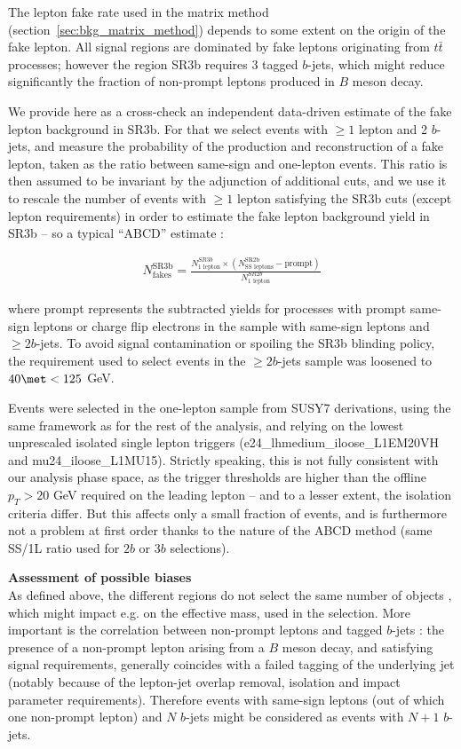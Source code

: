 The lepton fake rate used in the matrix method (section~\ref{sec:bkg_matrix_method}) depends to some extent on the origin of the fake lepton. 
All signal regions are dominated by fake leptons originating from $t\bar t$ processes; 
however the region SR3b requires 3 tagged $b$-jets, 
which might reduce significantly the fraction of non-prompt leptons produced in $B$ meson decay. 

We provide here as a cross-check an independent data-driven estimate of the fake lepton background in SR3b. 
For that we select events with $\ge 1$ lepton and 2 $b$-jets, 
and measure the probability of the production and reconstruction of a fake lepton, 
taken as the ratio between same-sign and one-lepton events. 
This ratio is then assumed to be invariant by the adjunction of additional cuts, 
and we use it to rescale the number of events with $\ge 1$ lepton satisfying the SR3b cuts (except lepton requirements) 
in order to estimate the fake lepton background yield in SR3b -- so a typical ``ABCD'' estimate : 

\begin{align}
N_\text{fakes}^\text{SR3b}=\frac{N_\text{1 lepton}^{SR3b}\times\left(N_\text{SS leptons}^\text{SR2b} - \text{prompt}\right)}{N_\text{1 lepton}^{SR2b}}
\end{align}

where \textrm{prompt} represents the subtracted yields for processes with prompt same-sign leptons or charge flip electrons in the sample with same-sign leptons and $\ge 2b$-jets. 
To avoid signal contamination or spoiling the SR3b blinding policy, the \met requirement used to select events in the $\ge 2b$-jets sample 
was loosened to $40\met<125$ GeV. 

Events were selected in the one-lepton sample from SUSY7 derivations, using the same framework as for the rest of the analysis, 
and relying on the lowest unprescaled isolated single lepton triggers 
(\textrm{e24\_lh\-me\-dium\_iloose\_L1EM20VH} and \textrm{mu24\_iloose\_L1MU15}). 
Strictly speaking, this is not fully consistent with our analysis phase space, 
as the trigger thresholds are higher than the offline $p_T>20$ GeV required on the leading lepton 
-- and to a lesser extent, the isolation criteria differ. 
But this affects only a small fraction of events, 
and is furthermore not a problem at first order thanks to the nature of the ABCD method (same SS/1L ratio used for $2b$ or $3b$ selections). 

\par{\bf Assessment of possible biases\\}
As defined above, the different regions do not select the same number of objects , 
which might impact e.g. on the effective mass, used in the selection. 
More important is the correlation between non-prompt leptons and tagged $b$-jets : 
the presence of a non-prompt lepton arising from a $B$ meson decay, and satisfying signal requirements, 
generally coincides with a failed tagging of the underlying jet (notably because of the lepton-jet overlap removal, isolation and impact parameter requirements). 
Therefore events with same-sign leptons (out of which one non-prompt lepton) and $N$ $b$-jets might be considered as events with $N+1$ $b$-jets. 

